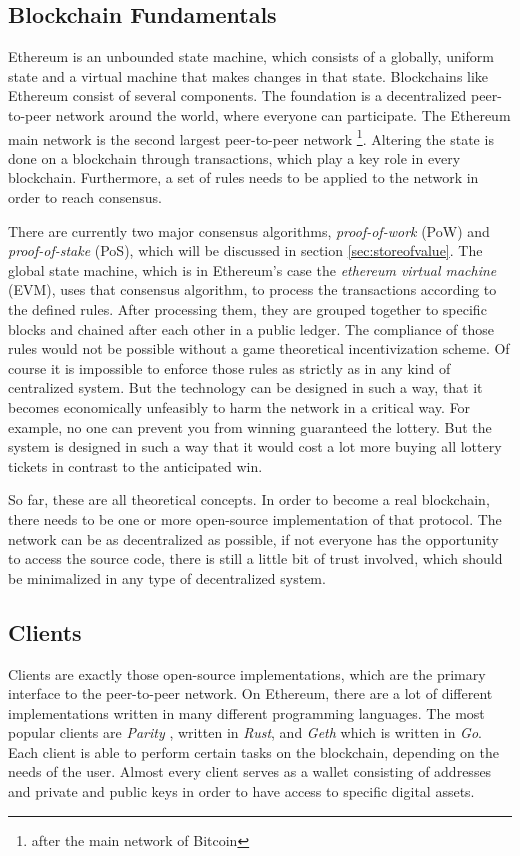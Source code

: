\subsection{Blockchain Fundamentals}
Ethereum is an unbounded state machine, which consists of a globally, uniform state and a virtual machine that makes changes in that state. Blockchains like Ethereum
consist of several components. The foundation is a decentralized peer-to-peer network around the world, where everyone can participate. The Ethereum main network is the second largest peer-to-peer network \footnote{after the main network of Bitcoin}. Altering the state is done on a blockchain through transactions, which play a key role in
every blockchain. Furthermore, a set of rules needs to be applied to the network in order to reach consensus.

There are currently two major consensus algorithms,
\textit{proof-of-work} (PoW) and \textit{proof-of-stake} (PoS), which will be discussed in section \ref{sec:storeofvalue}. The global state machine, which is in Ethereum's case the \textit{ethereum virtual machine} (EVM), uses that consensus algorithm, to process the transactions according to the defined rules. After processing them, they are grouped together to
specific blocks and chained after each other in a public ledger. The compliance of those rules would not be possible without a game theoretical incentivization
scheme. Of course it is impossible to enforce those rules as strictly as in any kind of centralized system. But the technology can be designed in such a way, that
it becomes economically unfeasibly to harm the network in a critical way. For example, no one can prevent you from winning guaranteed the lottery. But the system
is designed in such a way that it would cost a lot more buying all lottery tickets in contrast to the anticipated win.

So far, these are all theoretical concepts. In order to become a real blockchain, there needs to be one or more open-source implementation of that protocol. The
network can be as decentralized as possible, if not everyone has the opportunity to access the source code, there is still a little bit of trust involved, which
should be minimalized in any type of decentralized system.

\subsection{Clients}
Clients are exactly those open-source implementations, which are the primary interface to the peer-to-peer network. On Ethereum, there are a lot of different
implementations written in many different programming languages. The most popular clients are \textit{Parity} \cite{Parity}, written in \textit{Rust}, and \textit{Geth} \cite{Geth} which is written in \textit{Go}. Each client
is able to perform certain tasks on the blockchain, depending on the needs of the user. Almost every client serves as a wallet consisting of addresses and private and
public keys in order to have access to specific digital assets.

